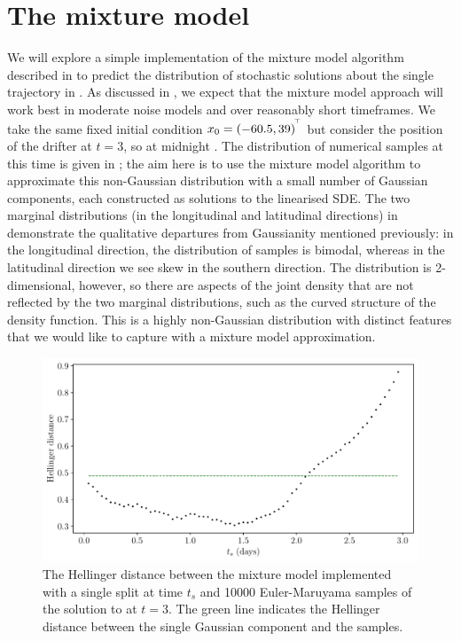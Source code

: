 \section{The mixture model}
We will explore a simple implementation of the mixture model algorithm described in  to predict the distribution of stochastic solutions about the single trajectory in .
As discussed in , we expect that the mixture model approach will work best in moderate noise models and over reasonably short timeframes.
We take the same fixed initial condition \(x_0 = \left(-60.5, 39\right)^{^{\!\top}}\) but consider the position of the drifter at \(t = 3\), so at midnight .
The distribution of numerical samples at this time is given in ; the aim here is to use the mixture model algorithm to approximate this non-Gaussian distribution with a small number of Gaussian components, each constructed as solutions to the linearised SDE.
The two marginal distributions (in the longitudinal and latitudinal directions) in  demonstrate the qualitative departures from Gaussianity mentioned previously: in the longitudinal direction, the distribution of samples is bimodal, whereas in the latitudinal direction we see skew in the southern direction.
The distribution is 2-dimensional, however, so there are aspects of the joint density that are not reflected by the two marginal distributions, such as the curved structure of the density function.
This is a highly non-Gaussian distribution with distinct features that we would like to capture with a mixture model approximation.

\begin{figure}
	\centering
	\includegraphics[width=\textwidth]{chp06_applications/figures/gulf_stream/hell_dist_split}
	\caption{The Hellinger distance between the mixture model implemented with a single split at time \(t_s\) and 10000 Euler-Maruyama samples of the solution to  at \(t = 3\).
		The green line indicates the Hellinger distance between the single Gaussian component and the samples.}
	\label{fig:na_1split_hell}
\end{figure}

